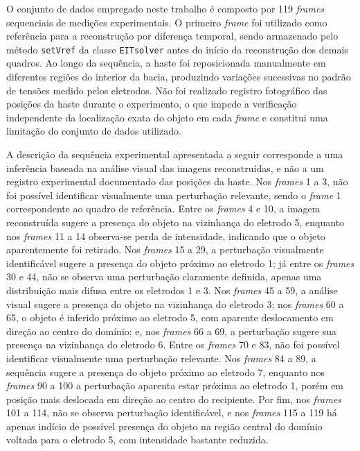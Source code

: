 O conjunto de dados empregado neste trabalho é composto por 119 \textit{frames} sequenciais de medições experimentais. O primeiro \textit{frame} foi utilizado como referência para a reconstrução por diferença temporal, sendo armazenado pelo método \texttt{setVref} da classe \texttt{EITsolver} antes do início da reconstrução dos demais quadros. Ao longo da sequência, a haste foi reposicionada manualmente em diferentes regiões do interior da bacia, produzindo variações sucessivas no padrão de tensões medido pelos eletrodos. Não foi realizado registro fotográfico das posições da haste durante o experimento, o que impede a verificação independente da localização exata do objeto em cada \textit{frame} e constitui uma limitação do conjunto de dados utilizado.

A descrição da sequência experimental apresentada a seguir corresponde a uma inferência baseada na análise visual das imagens reconstruídas, e não a um registro experimental documentado das posições da haste. Nos \textit{frames} 1 a 3, não foi possível identificar visualmente uma perturbação relevante, sendo o \textit{frame} 1 correspondente ao quadro de referência. Entre os \textit{frames} 4 e 10, a imagem reconstruída sugere a presença do objeto na vizinhança do eletrodo 5, enquanto nos \textit{frames} 11 a 14 observa-se perda de intensidade, indicando que o objeto aparentemente foi retirado. Nos \textit{frames} 15 a 29, a perturbação visualmente identificável sugere a presença do objeto próximo ao eletrodo 1; já entre os \textit{frames} 30 e 44, não se observa uma perturbação claramente definida, apenas uma distribuição mais difusa entre os eletrodos 1 e 3. Nos \textit{frames} 45 a 59, a análise visual sugere a presença do objeto na vizinhança do eletrodo 3; nos \textit{frames} 60 a 65, o objeto é inferido próximo ao eletrodo 5, com aparente deslocamento em direção ao centro do domínio; e, nos \textit{frames} 66 a 69, a perturbação sugere sua presença na vizinhança do eletrodo 6. Entre os \textit{frames} 70 e 83, não foi possível identificar visualmente uma perturbação relevante. Nos \textit{frames} 84 a 89, a sequência sugere a presença do objeto próximo ao eletrodo 7, enquanto nos \textit{frames} 90 a 100 a perturbação aparenta estar próxima ao eletrodo 1, porém em posição mais deslocada em direção ao centro do recipiente. Por fim, nos \textit{frames} 101 a 114, não se observa perturbação identificável, e nos \textit{frames} 115 a 119 há apenas indício de possível presença do objeto na região central do domínio voltada para o eletrodo 5, com intensidade bastante reduzida.


